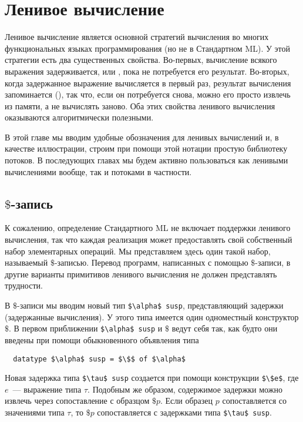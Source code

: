 \chapter{Ленивое вычисление}
\label{ch:4}

Ленивое вычисление является основной стратегий вычисления во многих
функциональных языках программирования (но не в Стандартном ML). У
этой стратегии есть два существенных свойства. Во-первых, вычисление
всякого выражения задерживается, или ,
пока не потребуется его результат. Во-вторых, когда задержанное
выражение вычисляется в первый раз, результат вычисления запоминается
(), так что, если он потребуется снова,
можно его просто извлечь из памяти, а не вычислять заново. Оба этих свойства
ленивого вычисления оказываются алгоритмически полезными.

В этой главе мы вводим удобные обозначения для ленивых вычислений и, в
качестве иллюстрации, строим при помощи этой нотации простую
библиотеку потоков. В последующих главах мы будем активно пользоваться
как ленивыми вычислениями вообще, так и потоками в частности.

\section{$\$$-запись}
\label{sc:4.1}

К сожалению, определение Стандартного ML \cite{Milner-etal1997} не
включает поддержки ленивого вычисления, так что каждая реализация
может предоставлять свой собственный набор элементарных операций.
Мы представляем здесь один такой набор,
называемый $\$$-записью.  Перевод программ, написанных с помощью
$\$$-записи, в другие варианты примитивов ленивого вычисления не
должен представлять трудности.

В $\$$-записи мы вводим новый тип \lstinline!$\alpha$ susp!,
представляющий задержки (задержанные вычисления). У этого типа имеется один
одноместный конструктор $\$$. В первом приближении 
\lstinline!$\alpha$ susp! и $\$$ ведут себя так, как будто они введены при помощи
обыкновенного объявления типа
\begin{lstlisting}
  datatype $\alpha$ susp = $\$$ of $\alpha$
\end{lstlisting}
Новая задержка типа \lstinline!$\tau$ susp! создается
при помощи конструкции \lstinline!$\$e$!, где $e$~---
выражение типа $\tau$. Подобным же образом, содержимое задержки можно
извлечь через сопоставление с образцом
$\$p$. Если образец $p$ сопоставляется со значениями типа $\tau$, то
$\$p$ сопоставляется с задержками типа
\lstinline!$\tau$ susp!.

